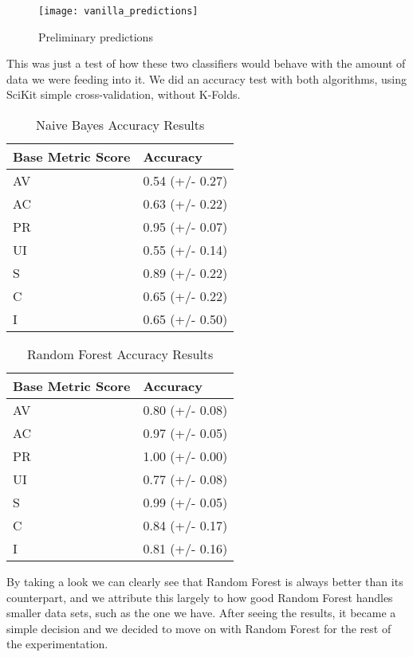 \begin{figure}[H]
	\caption{Preliminary predictions}
	\centering
	\texttt{[image: vanilla\_predictions]}
\end{figure}

This was just a test of how these two classifiers would behave with the amount of data we were feeding into it. We did an accuracy test with both algorithms, using SciKit \parencite{scikit} simple cross-validation, without K-Folds.

\begin{table}[H]
	\centering
	\caption{Naive Bayes Accuracy Results}
	\begin{tabular}{ |p{4cm}||p{10cm}|  }
		\hline
		Base Metric Score & Accuracy\\
		\hline
		AV   & 0.54 (+/- 0.27) \\ 
		AC &   0.63 (+/- 0.22)  \\
		PR & 0.95 (+/- 0.07)  \\
		UI    & 0.55 (+/- 0.14)  \\
		S   & 0.89 (+/- 0.22)  \\
		C   & 0.65 (+/- 0.22)  \\
		I    & 0.65 (+/- 0.50)  \\
		\hline
	\end{tabular}
\end{table}

\begin{table}[H]
	\centering
	\caption{Random Forest Accuracy Results}
	\begin{tabular}{ |p{4cm}||p{10cm}|  }
		\hline
		Base Metric Score & Accuracy\\
		\hline
		AV   & 0.80 (+/- 0.08) \\ 
		AC &   0.97 (+/- 0.05)  \\
		PR & 1.00 (+/- 0.00)  \\
		UI    & 0.77 (+/- 0.08)  \\
		S   & 0.99 (+/- 0.05)  \\
		C   & 0.84 (+/- 0.17) \\
		I    & 0.81 (+/- 0.16)  \\
		\hline
	\end{tabular}
\end{table}

By taking a look we can clearly see that Random Forest is always better than its counterpart, and we attribute this largely to how good Random Forest handles smaller data sets, such as the one we have. After seeing the results, it became a simple decision and we decided to move on with Random Forest for the rest of the experimentation.

